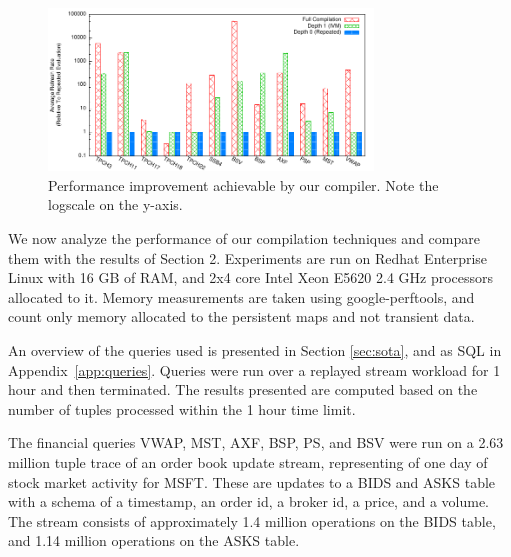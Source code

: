 
\newcommand{\figurewidth}[0]{1.8in}

\newcommand{\tablefig}[1]{
  \hspace*{-0.25in}
  \texttt{[image: ../graphs/graphs/\#1]}
}

\begin{figure}
\begin{center}
\includegraphics[width=3.4in]{../graphs/graphs/bakeoff.pdf}
\caption{Performance improvement achievable by our compiler.  Note the logscale on the y-axis. }
\label{fig:experiments:bakeoff}
\end{center}
\vspace*{-0.3in}
\end{figure}

We now analyze the performance of our compilation techniques and compare them with the results of Section 2.  Experiments are run on Redhat Enterprise Linux with 16 GB of RAM, and 2x4 core Intel Xeon E5620 2.4 GHz processors allocated to it.
Memory measurements are taken using google-perftools, and count only memory allocated to the persistent maps and not transient data.  

An overview of the queries used is presented in Section \ref{sec:sota}, and as SQL in Appendix~\ref{app:queries}.
Queries were run over a replayed stream workload for 1 hour and then terminated. The results presented are computed based on the number of tuples processed within the 1 hour time limit.

The financial queries VWAP, MST, AXF, BSP, PS, and BSV were run on a 2.63 million tuple trace of an order book update stream, representing of one day of stock market activity for MSFT.  These are updates to a BIDS and ASKS table with a schema of a timestamp, an order id, a broker id, a price, and a volume.  The stream consists of approximately 1.4 million operations on the BIDS table, and 1.14 million operations on the ASKS table.  


